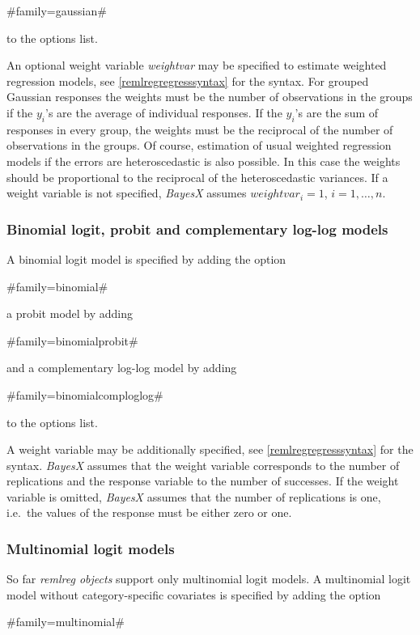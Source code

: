 #family=gaussian#

to the options list.

An optional weight variable {\em weightvar} may be specified to
estimate weighted regression models, see
\autoref{remlregregresssyntax} for the syntax. For grouped
Gaussian responses the weights must be the number of observations
in the groups if the $y_i$'s are the average of individual
responses. If the $y_i$'s are the sum of responses in every group,
the weights must be the reciprocal of the number of observations
in the groups. Of course, estimation of usual weighted regression
models if the errors are heteroscedastic is also possible. In this
case the weights should be proportional to the reciprocal of the
heteroscedastic variances. If a weight variable is not specified,
{\em BayesX} assumes $weightvar_i = 1$, $i=1,\dots,n$.

\subsubsection*{Binomial logit, probit and complementary log-log
models}

A binomial logit model is specified by adding the option

#family=binomial#

a probit model by adding

#family=binomialprobit#

and a complementary log-log model by adding

#family=binomialcomploglog#

to the options list.

A weight variable may be additionally specified, see
\autoref{remlregregresssyntax} for the syntax. {\em BayesX}
assumes that the weight variable corresponds to the number of
replications and the response variable to the number of successes.
If the weight variable is omitted, {\em BayesX} assumes that the
number of replications is one, i.e.~the values of the response
must be either zero or one.

\subsubsection*{Multinomial logit models}

So far {\em remlreg objects} support only multinomial logit models.
A multinomial logit model without category-specific covariates is
specified by adding the option

#family=multinomial#

